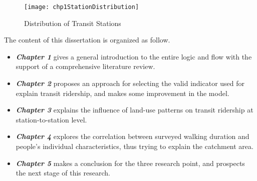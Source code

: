 \begin{figure}[htbp]
	\centering
	\texttt{[image: chp1StationDistribution]}
	\caption{Distribution of Transit Stations}
	\label{fig:chp1:StationDistribution}
\end{figure}

The content of this dissertation is organized as follow.

\begin{itemize}
	\item \emph{\textbf{Chapter 1}} gives a general introduction to the entire logic and flow with the support of a comprehensive literature review.
	\item \emph{\textbf{Chapter 2}} proposes an approach for selecting the valid indicator used for explain transit ridership, and makes some improvement in the model.
	\item \emph{\textbf{Chapter 3}} explains the influence of land-use patterns on transit ridership at station-to-station level.
	\item \emph{\textbf{Chapter 4}} explores the correlation between surveyed walking duration and people's individual characteristics, thus trying to explain the catchment area.
	\item \emph{\textbf{Chapter 5}} makes a conclusion for the three research point, and prospects the next stage of this research.
\end{itemize}

\clearpage %

